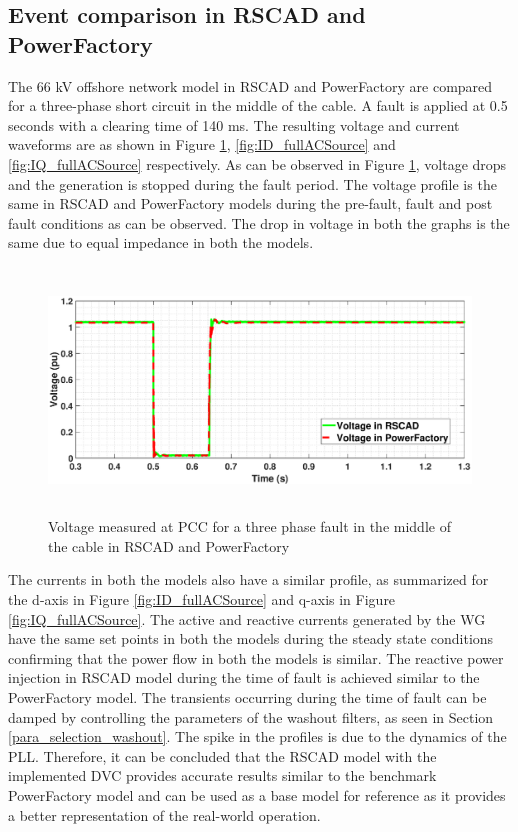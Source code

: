 \subsection{Event comparison in RSCAD and PowerFactory}
The 66 kV offshore network model in RSCAD and PowerFactory are compared for a three-phase short circuit in the middle of the cable. A fault is applied at 0.5 seconds with a clearing time of 140 ms. The resulting voltage and current waveforms are as shown in Figure \ref{fig:VACP_comp},  \ref{fig:ID_fullACSource} and \ref{fig:IQ_fullACSource} respectively. As can be observed in Figure \ref{fig:VACP_comp}, voltage drops and the generation is stopped during the fault period. The voltage profile is the same in RSCAD and PowerFactory models during the pre-fault, fault and post fault conditions as can be observed. The drop in voltage in both the graphs is the same due to equal impedance in both the models. 

\begin{figure}[H]
    \includegraphics[height = 6.5cm,width = \textwidth]{Diagrams/Chapter_3/VACP_Comp_New_3.eps}
    \caption{Voltage measured at PCC for a three phase fault in the middle of the cable in RSCAD and PowerFactory}
    \label{fig:VACP_comp}
\end{figure}


The currents in both the models also have a similar profile, as summarized for the d-axis in Figure \ref{fig:ID_fullACSource} and q-axis in Figure \ref{fig:IQ_fullACSource}. The active and reactive currents generated by the \gls{WG} have the same set points in both the models during the steady state conditions confirming that the power flow in both the models is similar. The reactive power injection in RSCAD model during the time of fault is achieved similar to the PowerFactory model. The transients occurring during the time of fault can be damped by controlling the parameters of the washout filters, as seen in Section \ref{para_selection_washout}. The spike in the profiles is due to the dynamics of the \gls{PLL}. Therefore, it can be concluded that the RSCAD model with the implemented \gls{DVC} provides accurate results similar to the benchmark PowerFactory model and can be used as a base model for reference as it provides a better representation of the real-world operation.  

